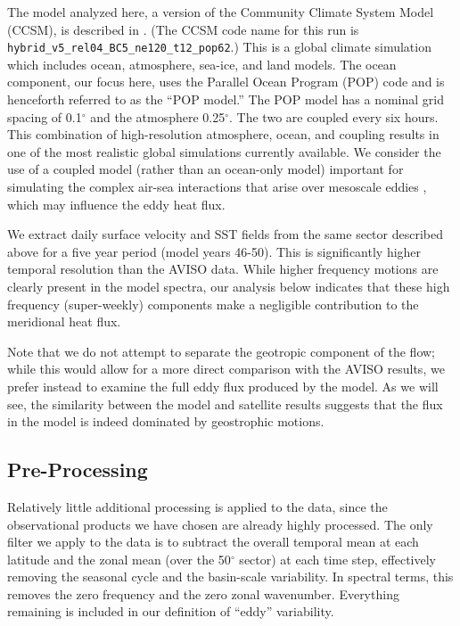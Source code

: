 \documentclass[10pt]{article}
\begin{document}
The model analyzed here, a version of the Community Climate System Model (CCSM), is described in \citet{MccleanEtAl2011}.  (The CCSM code name for this run is {\tt 	hybrid\_v5\_rel04\_BC5\_ne120\_t12\_pop62}.) This is a global climate simulation which includes ocean, atmosphere, sea-ice, and land models. The ocean component, our focus here, uses the Parallel Ocean Program (POP) code and is henceforth referred to as the ``POP model.'' The POP model has a nominal grid spacing of 0.1$^\circ$ and the atmosphere 0.25$^\circ$. The two are coupled every six hours. This combination of high-resolution atmosphere, ocean, and coupling results in one of the most realistic global simulations currently available. We consider the use of a coupled model (rather than an ocean-only model) important for simulating the complex air-sea interactions that arise over mesoscale eddies \citep{SmallEtAl2008,BryanEtAl2010}, which may influence the eddy heat flux.

We extract daily surface velocity and SST fields from the same sector described above for a five year period (model years 46-50). This is significantly higher temporal resolution than the AVISO data. While higher frequency motions are clearly present in the model spectra, our analysis below indicates that these high frequency (super-weekly) components make a negligible contribution to the meridional heat flux.

Note that we do not attempt to separate the geotropic component of the flow; while this would allow for a more direct comparison with the AVISO results, we prefer instead to examine the full eddy flux produced by the model. As we will see, the similarity between the model and satellite results suggests that the flux in the model is indeed dominated by geostrophic motions.

\subsection{Pre-Processing}

Relatively little additional processing is applied to the data, since the observational products we have chosen are already highly processed. The only filter we apply to the data is to subtract the overall temporal mean at each latitude and the zonal mean (over the 50$^\circ$ sector) at each time step, effectively removing the seasonal cycle and the basin-scale variability. In spectral terms, this removes the zero frequency and the zero zonal wavenumber. Everything remaining is included in our definition of ``eddy'' variability.
\end{document}
